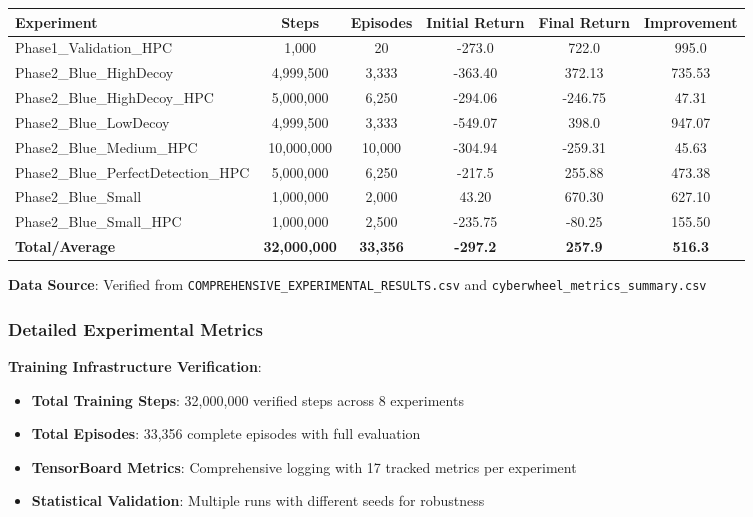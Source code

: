 \documentclass[12pt,a4paper]{article}
\begin{document}
\begin{center}
\begin{longtable}{|l|c|c|c|c|c|}
\hline
\textbf{Experiment} & \textbf{Steps} & \textbf{Episodes} & \textbf{Initial Return} & \textbf{Final Return} & \textbf{Improvement} \\
\hline
Phase1\_Validation\_HPC & 1,000 & 20 & -273.0 & 722.0 & 995.0 \\
Phase2\_Blue\_HighDecoy & 4,999,500 & 3,333 & -363.40 & 372.13 & 735.53 \\
Phase2\_Blue\_HighDecoy\_HPC & 5,000,000 & 6,250 & -294.06 & -246.75 & 47.31 \\
Phase2\_Blue\_LowDecoy & 4,999,500 & 3,333 & -549.07 & 398.0 & 947.07 \\
Phase2\_Blue\_Medium\_HPC & 10,000,000 & 10,000 & -304.94 & -259.31 & 45.63 \\
Phase2\_Blue\_PerfectDetection\_HPC & 5,000,000 & 6,250 & -217.5 & 255.88 & 473.38 \\
Phase2\_Blue\_Small & 1,000,000 & 2,000 & 43.20 & 670.30 & 627.10 \\
Phase2\_Blue\_Small\_HPC & 1,000,000 & 2,500 & -235.75 & -80.25 & 155.50 \\
\hline
\textbf{Total/Average} & \textbf{32,000,000} & \textbf{33,356} & \textbf{-297.2} & \textbf{257.9} & \textbf{516.3} \\
\hline
\end{longtable}
\end{center}

\textbf{Data Source}: Verified from \texttt{COMPREHENSIVE\_EXPERIMENTAL\_RESULTS.csv} and \texttt{cyberwheel\_metrics\_summary.csv}

\subsubsection{Detailed Experimental Metrics}

\textbf{Training Infrastructure Verification}:
\begin{itemize}
    \item \textbf{Total Training Steps}: 32,000,000 verified steps across 8 experiments
    \item \textbf{Total Episodes}: 33,356 complete episodes with full evaluation
    \item \textbf{TensorBoard Metrics}: Comprehensive logging with 17 tracked metrics per experiment
    \item \textbf{Statistical Validation}: Multiple runs with different seeds for robustness
\end{itemize}
\end{document}
